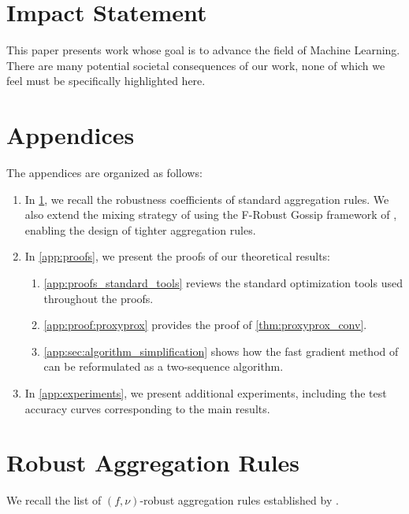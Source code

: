 \documentclass{article}
\theoremstyle{plain}
\theoremstyle{definition}
\theoremstyle{remark}
\begin{document}
\section*{Impact Statement}

This paper presents work whose goal is to advance the field of Machine
Learning. There are many potential societal consequences of our work, none
of which we feel must be specifically highlighted here.





\newpage
\appendix
\onecolumn






\section*{Appendices}
The appendices are organized as follows:
\begin{enumerate}
    \item In \cref{app:sec:robust_aggregation}, we recall the robustness coefficients of standard aggregation rules. We also extend the mixing strategy of \citet{allouah2023fixing} using the F-Robust Gossip framework of \citet{gaucher2025unified}, enabling the design of tighter aggregation rules.
    \item In \cref{app:proofs}, we present the proofs of our theoretical results:
    \begin{enumerate}
        \item \cref{app:proofs_standard_tools} reviews the standard optimization tools used throughout the proofs.
        \item \cref{app:proof:proxyprox} provides the proof of \cref{thm:proxyprox_conv}.
        \item \cref{app:sec:algorithm_simplification} shows how the fast gradient method of \citet{devolder2014first} can be reformulated as a two-sequence algorithm.
    \end{enumerate}
    \item In \cref{app:experiments}, we present additional experiments, including the test accuracy curves corresponding to the main results.
\end{enumerate}

\section{Robust Aggregation Rules}
\label{app:sec:robust_aggregation}
We recall the list of $(f,\nu)$-robust aggregation rules established by \citet{allouah2023fixing}. 
\end{document}
